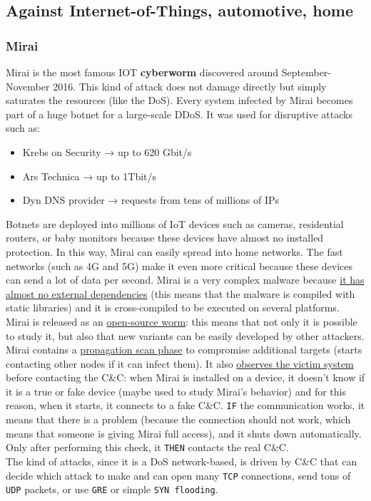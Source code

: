 \subsection*{Against Internet-of-Things, automotive, home}

\subsubsection*{Mirai}
Mirai is the most famous IOT \textbf{cyberworm} discovered around September-November 2016. This kind of attack does not damage directly but simply saturates the resources (like the DoS). Every system infected by Mirai becomes part of a huge botnet for a large-scale DDoS. It was used for disruptive attacks such as:
\begin{itemize}
  \item Krebs on Security → up to 620 Gbit/s
  \item Ars Technica → up to 1Tbit/s
  \item Dyn DNS provider → requests from tens of millions of IPs
\end{itemize}

Botnets are deployed into millions of IoT devices such as cameras, residential routers, or baby monitors because these devices have almost no installed protection. In this way, Mirai can easily spread into home networks. The fast networks (such as 4G and 5G) make it even more critical because these devices can send a lot of data per second.
Mirai is a very complex malware because \ul{it has almost no external dependencies} (this means that the malware is compiled with static libraries) and it is cross-compiled to be executed on several platforms. Mirai is released as an \ul{open-source worm}: this means that not only it is possible to study it, but also that new variants can be easily developed by other attackers.
Mirai contains a \ul{propagation scan phase} to compromise additional targets (starts contacting other nodes if it can infect them).
It also \ul{observes the victim system} before contacting the C\&C: when Mirai is installed on a device, it doesn't know if it is a true or fake device (maybe used to study Mirai's behavior) and for this reason, when it starts, it connects to a fake C\&C. \texttt{IF} the communication works, it means that there is a problem (because the connection should not work, which means that someone is giving Mirai full access), and it shuts down automatically. Only after performing this check, it \texttt{THEN} contacts the real C\&C.\\
The kind of attacks, since it is a DoS network-based, is driven by C\&C that can decide which attack to make and can open many \texttt{TCP} connections, send tons of \texttt{UDP} packets, or use \texttt{GRE} or simple \texttt{SYN flooding}.

